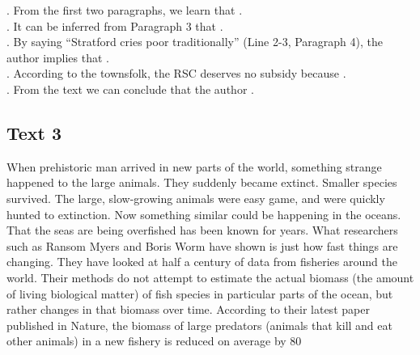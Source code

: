 \begin{questions}  .	From the first two paragraphs, we learn that \ltk{}.\\
 .	It can be inferred from Paragraph 3 that \ltk{}.\\
 .	By saying “Stratford cries poor traditionally” (Line 2-3, Paragraph 4), the author implies that \ltk{}.\\
 .	According to the townsfolk, the RSC deserves no subsidy because \ltk{}.\\
 .	From the text we can conclude that the author \ltk{}.\\
\end{questions}    \subsection{Text 3}
When prehistoric man arrived in new parts of the world, something strange happened to the large animals. They suddenly became extinct. Smaller species survived. The large, slow-growing animals were easy game, and were quickly hunted to extinction. Now something similar could be happening in the oceans.
That the seas are being overfished has been known for years. What researchers such as Ransom Myers and Boris Worm have shown is just how fast things are changing. They have looked at half a century of data from fisheries around the world. Their methods do not attempt to estimate the actual biomass (the amount of living biological matter) of fish species in particular parts of the ocean, but rather changes in that biomass over time. According to their latest paper published in Nature, the biomass of large predators (animals that kill and eat other animals) in a new fishery is reduced on average by 80%
